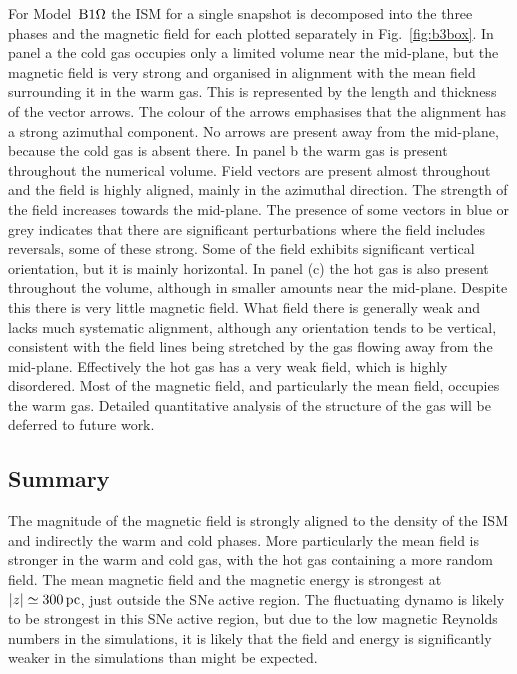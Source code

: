   For Model~${\mathrm{B}1\rm{\Omega} }$ the ISM for a single snapshot is decomposed into the 
  three phases and the magnetic field for each plotted separately in 
  Fig.~\ref{fig:b3box}.
  In panel a the cold gas occupies only a limited volume near the mid-plane, 
  but the magnetic field is very strong and organised in alignment with the
  mean field surrounding it in the warm gas. 
  This is represented by the length and thickness of the vector arrows.  
  The colour of the arrows emphasises that the alignment has a strong 
  azimuthal component. 
  No arrows are present away from the mid-plane, because the cold gas is absent 
  there.
  In panel b the warm gas is present throughout the numerical volume.
  Field vectors are present almost throughout and the field is highly aligned,
  mainly in the azimuthal direction. 
  The strength of the field increases towards the mid-plane.
  The presence of some vectors in blue or grey indicates that there are 
  significant perturbations where the field includes reversals, some of these
  strong.
  Some of the field exhibits significant vertical orientation, but it is 
  mainly horizontal.
  In panel (c) the hot gas is also present throughout the volume, although 
  in smaller amounts near the mid-plane. 
  Despite this there is very little magnetic field.
  What field there is generally weak and lacks much systematic alignment, 
  although any orientation tends to be vertical, consistent with the
  field lines being stretched by the gas flowing away from the mid-plane. 
  Effectively the hot gas has a very weak field, which is highly disordered.
  Most of the magnetic field, and particularly the mean field, occupies the 
  warm gas.
  Detailed quantitative analysis of the structure of the gas will be deferred to
  future work.

  \subsection{Summary}
  The magnitude of the magnetic field is strongly aligned to the density of the
  ISM and indirectly the warm and cold phases.
  More particularly the mean field is stronger in the warm and cold gas, with 
  the hot gas containing a more random field. 
  The mean magnetic field and the magnetic energy is strongest at 
  $|z|\simeq300\,{\rm pc}$, just outside the SNe active region. 
  The fluctuating dynamo is likely to be strongest in this SNe active region,
  but due to the low magnetic Reynolds numbers in the simulations, it is likely
  that the field and energy is significantly weaker in the simulations than 
  might be expected.





